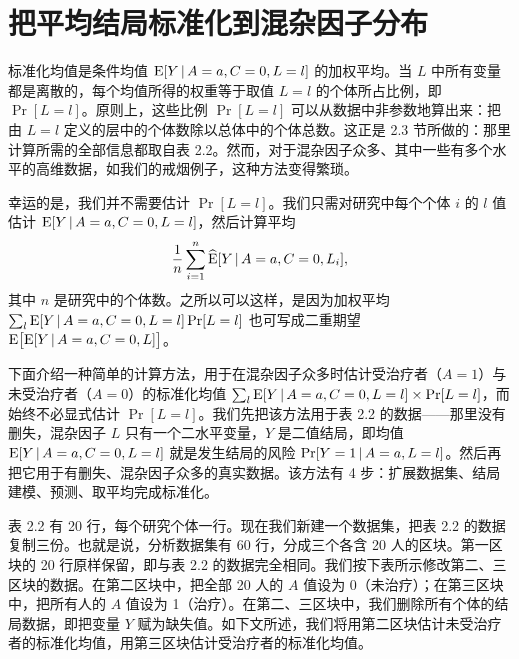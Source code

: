 \section{把平均结局标准化到混杂因子分布}

标准化均值是条件均值 $\mathrm{E}[Y\,|\, A=a,C=0,L=l]$ 的加权平均。当 $L$ 中所有变量都是离散的，每个均值所得的权重等于取值 $L=l$ 的个体所占比例，即 $\Pr[L=l]$。原则上，这些比例 $\Pr[L=l]$ 可以从数据中非参数地算出来：把由 $L=l$ 定义的层中的个体数除以总体中的个体总数。这正是 2.3 节所做的：那里计算所需的全部信息都取自表 2.2。然而，对于混杂因子众多、其中一些有多个水平的高维数据，如我们的戒烟例子，这种方法变得繁琐。

幸运的是，我们并不需要估计 $\Pr[L=l]$。我们只需对研究中每个个体 $i$ 的 $l$ 值估计 $\mathrm{E}[Y\,|\, A=a,C=0,L=l]$，然后计算平均
\[
\frac{1}{n}\sum_{i=1}^{n}\widehat{\mathrm{E}}[Y\,|\, A=a,C=0,L_i],
\]
其中 $n$ 是研究中的个体数。之所以可以这样，是因为加权平均 $\sum_l \mathrm{E}[Y\,|\, A=a,C=0,L=l]\Pr[L=l]$ 也可写成二重期望 $\mathrm{E}\bigl[\mathrm{E}[Y\,|\, A=a,C=0,L]\bigr]$。

下面介绍一种简单的计算方法，用于在混杂因子众多时估计受治疗者（$A=1$）与未受治疗者（$A=0$）的标准化均值 $\sum_l \mathrm{E}[Y\,|\, A=a,C=0,L=l]\times\Pr[L=l]$，而始终不必显式估计 $\Pr[L=l]$。我们先把该方法用于表 2.2 的数据——那里没有删失，混杂因子 $L$ 只有一个二水平变量，$Y$ 是二值结局，即均值 $\mathrm{E}[Y\,|\, A=a,C=0,L=l]$ 就是发生结局的风险 $\Pr[Y=1\,|\, A=a,L=l]$。然后再把它用于有删失、混杂因子众多的真实数据。该方法有 4 步：扩展数据集、结局建模、预测、取平均完成标准化。

表 2.2 有 20 行，每个研究个体一行。现在我们新建一个数据集，把表 2.2 的数据复制三份。也就是说，分析数据集有 60 行，分成三个各含 20 人的区块。第一区块的 20 行原样保留，即与表 2.2 的数据完全相同。我们按下表所示修改第二、三区块的数据。在第二区块中，把全部 20 人的 $A$ 值设为 0（未治疗）；在第三区块中，把所有人的 $A$ 值设为 1（治疗）。在第二、三区块中，我们删除所有个体的结局数据，即把变量 $Y$ 赋为缺失值。如下文所述，我们将用第二区块估计未受治疗者的标准化均值，用第三区块估计受治疗者的标准化均值。

